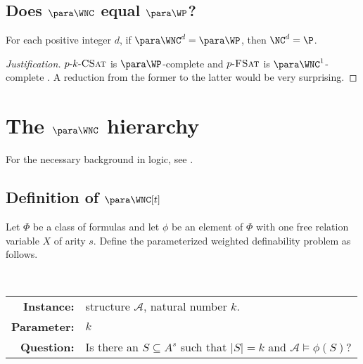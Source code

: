 \documentclass{article}
\newenvironment{justification}{\begin{proof}[Justification]}{\end{proof}}
\newcommand{\dash}{\textnormal{-}}
\begin{document}
\subsection{Does \texorpdfstring{$\para \WNC$}{paraWNC} equal \texorpdfstring{$\para \WP$}{paraWP}?}
\label{sec:wncwp}

\begin{conjecture}
  For each positive integer $d$, if $\para \WNC^d = \para \WP$, then $\NC^d = \P$.
\end{conjecture}
\begin{justification}
  $p \dash k \dash \textsc{CSat}$ is $\para \WP$-complete and $p \dash \textsc{FSat}$ is $\para \WNC^1$-complete \autocite[Theorem~3.6]{est15}.
  A reduction from the former to the latter would be very surprising.
\end{justification}

\section{The \texorpdfstring{$\para \WNC$}{paraWNC} hierarchy}

For the necessary background in logic, see \autocite[Chapter~4]{fg06}.

\subsection{Definition of \texorpdfstring{$\para \WNC[t]$}{paraWNC[t]}}

Let $\Phi$ be a class of formulas and let $\phi$ be an element of $\Phi$ with one free relation variable $X$ of arity $s$.
Define the parameterized weighted definability problem as follows.


\begin{definition}[{$p \dash \WD_\phi$ \autocite[Section~5.1]{fg06}}]
  \mbox{} \\
  \begin{tabular}{r p{9.2cm}}
    \textbf{Instance:} & structure $\mathcal{A}$, natural number $k$. \\
    \textbf{Parameter:} & $k$ \\
    \textbf{Question:} & Is there an $S \subseteq A^s$ such that $|S| = k$ and $\mathcal{A} \models \phi(S)$?
  \end{tabular}
\end{definition}
\end{document}
